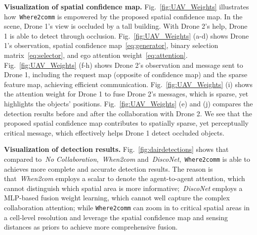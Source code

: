 \documentclass{article}
\begin{document}
\textbf{Visualization of spatial confidence map.} Fig.~\ref{fig:UAV_Weights} illustrates how~\texttt{Where2comm} is empowered by the proposed spatial confidence map. In the scene, Drone 1's view is occluded by a tall building. With Drone 2's help, Drone 1 is able to detect through occlusion. Fig.~\ref{fig:UAV_Weights} (a-d) shows Drone 1's observation, spatial confidence map~\eqref{eq:generator}, binary selection matrix~\eqref{eq:selector}, and ego attention weight~\eqref{eq:attention}. Fig.~\ref{fig:UAV_Weights} (f-h) shows Drone 2's observation and message sent to Drone 1, including the request map (opposite of confidence map) and the sparse feature map, achieving efficient communication. Fig.~\ref{fig:UAV_Weights} (i) shows the attention weight for Drone 1 to fuse Drone 2's messages, which is sparse, yet highlights the objects' positions. Fig.~\ref{fig:UAV_Weights} (e) and (j) compares the detection results before and after the collaboration with Drone 2. We see that the proposed spatial confidence map contributes to spatially sparse, yet perceptually critical message, which effectively helps Drone 1 detect occluded objects.






\textbf{Visualization of detection results.} Fig.~\ref{fig:dairdetections} shows that compared to~\textit{No Collaboration},~\textit{When2com} and~\textit{DiscoNet},~\texttt{Where2comm} is able to achieves more complete and accurate detection results. The reason is that~\textit{When2com} employs a scalar to denote the agent-to-agent attention, which cannot distinguish which spatial area is more informative;~\textit{DiscoNet} employs a MLP-based fusion weight learning, which cannot well capture the complex collaboration attention; while \texttt{Where2comm} can zoom in to critical spatial areas in a cell-level resolution and leverage  the spatial confidence map and sensing distances as priors to achieve more comprehensive fusion.
\end{document}
